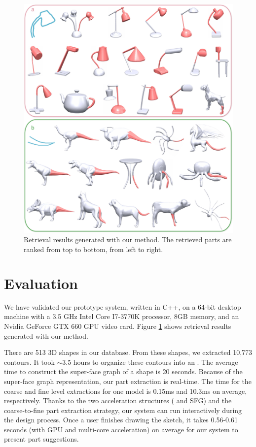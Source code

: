 
\begin{figure}\centering
\includegraphics[width=1.0\linewidth]{./Material/MoreRetrievalRes.pdf}
\caption{Retrieval results generated with our method. The retrieved parts are ranked from top to bottom, from left to right.}\label{fig:MoreRetrievalRes}
\end{figure}

\section{Evaluation}

We have validated our prototype system, written in C++, on a 64-bit desktop machine with a 3.5 GHz Intel Core I7-3770K processor, 8GB memory, and an Nvidia GeForce GTX 660 GPU video card. Figure \ref{fig:MoreRetrievalRes} shows retrieval results generated with our method.

There are 513 3D shapes in our database. From these shapes, we extracted 10,773 contours. It took $\sim$3.5 hours to organize these contours into an {\RCKNNG}. The average time to construct the super-face graph of a shape is 20 seconds. Because of the super-face graph representation, our part extraction is real-time. The time for the coarse and fine level extractions for one model is 0.15ms and 10.3ms on average, respectively. Thanks to the two acceleration structures ({\RCKNNG} and SFG) and the coarse-to-fine part extraction strategy, our system can run interactively during the design process. Once a user finishes drawing the sketch, it takes 0.56-0.61 seconds (with GPU and multi-core acceleration) on average for our system to present part suggestions.

